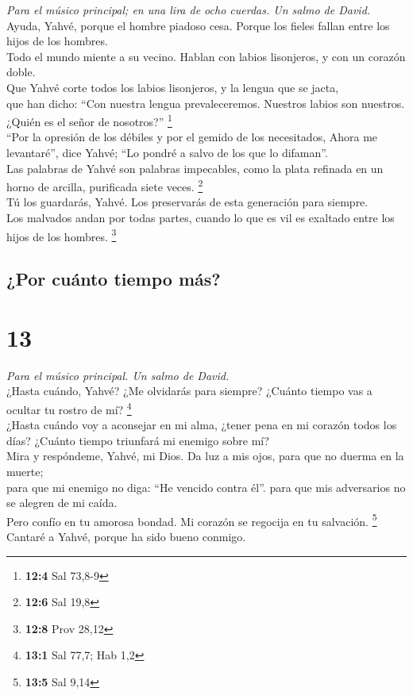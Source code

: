 \emph{Para el músico principal; en una lira de ocho cuerdas. Un salmo de
David.}\\
 Ayuda, Yahvé, porque el hombre piadoso cesa. Porque los
fieles fallan entre los hijos de los hombres.\\
 Todo el mundo miente a su vecino. Hablan con labios
lisonjeros, y con un corazón doble.\\
 Que Yahvé corte todos los labios lisonjeros, y la lengua
que se jacta,\\
 que han dicho: ``Con nuestra lengua prevaleceremos.
Nuestros labios son nuestros. ¿Quién es el señor de nosotros?''
\footnote{\textbf{12:4} Sal 73,8-9}\\
 ``Por la opresión de los débiles y por el gemido de los
necesitados, Ahora me levantaré'', dice Yahvé; ``Lo pondré a salvo de
los que lo difaman''.\\
 Las palabras de Yahvé son palabras impecables, como la
plata refinada en un horno de arcilla, purificada siete veces.
\footnote{\textbf{12:6} Sal 19,8}\\
 Tú los guardarás, Yahvé. Los preservarás de esta
generación para siempre.\\
 Los malvados andan por todas partes, cuando lo que es vil
es exaltado entre los hijos de los hombres. \footnote{\textbf{12:8} Prov
  28,12}

\hypertarget{por-cuuxe1nto-tiempo-muxe1s}{%
\subsection{¿Por cuánto tiempo más?}\label{por-cuuxe1nto-tiempo-muxe1s}}

\hypertarget{section-12}{%
\section{13}\label{section-12}}

\emph{Para el músico principal. Un salmo de David.}\\
 ¿Hasta cuándo, Yahvé? ¿Me olvidarás para siempre? ¿Cuánto
tiempo vas a ocultar tu rostro de mí? \footnote{\textbf{13:1} Sal 77,7;
  Hab 1,2}\\
 ¿Hasta cuándo voy a aconsejar en mi alma, ¿tener pena en
mi corazón todos los días? ¿Cuánto tiempo triunfará mi enemigo sobre
mí?\\
 Mira y respóndeme, Yahvé, mi Dios. Da luz a mis ojos,
para que no duerma en la muerte;\\
 para que mi enemigo no diga: ``He vencido contra él''.
para que mis adversarios no se alegren de mi caída.\\
 Pero confío en tu amorosa bondad. Mi corazón se regocija
en tu salvación. \footnote{\textbf{13:5} Sal 9,14}\\
 Cantaré a Yahvé, porque ha sido bueno conmigo.

